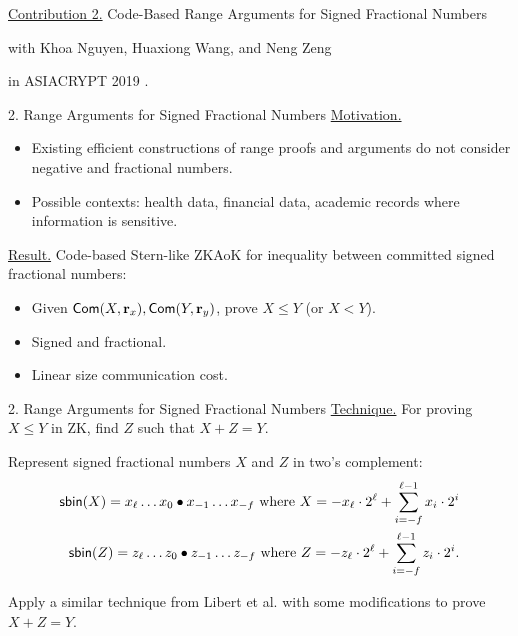 \begin{frame}
	\underline{Contribution 2.} Code-Based Range Arguments for Signed Fractional Numbers
	
	{\small with Khoa Nguyen, Huaxiong Wang, and Neng Zeng}
	
	in ASIACRYPT 2019 \cite{NguyenTWZ19}.
\end{frame}

\begin{frame}{2. Range Arguments for Signed Fractional Numbers}
	\underline{Motivation.} \pause
	\begin{itemize}
		\item Existing efficient constructions of range proofs and arguments do not consider negative and fractional numbers.\pause
		\item Possible contexts: health data, financial data, academic records where information is sensitive.\pause
	\end{itemize}

	\underline{Result.} Code-based Stern-like ZKAoK for inequality between committed signed fractional numbers:\pause
	\begin{itemize}
		\item Given $\mathsf{Com }(X, \mathbf{r}_x), \mathsf{Com }(Y, \mathbf{r}_y)$, prove $X \leq Y$ (or $X < Y$).\pause 
		\item Signed and fractional.\pause
		\item Linear size communication cost.
	\end{itemize}
	
\end{frame}

\begin{frame}{2. Range Arguments for Signed Fractional Numbers}
	\underline{Technique.} For proving $X \leq Y$ in ZK, find $Z$ such that $X + Z = Y$.\pause
	
	Represent signed fractional numbers $X$ and $Z$ in two's complement:\pause
	\begin{align*}
		\mathsf{sbin}(X) = x_\ell \dots x_0\bullet x_{-1}\dots x_{-f} \text{ where } X = -x_\ell \cdot 2^{\ell} + \sum_{i = -f}^{\ell-1} x_i\cdot 2^i\\ 
		\mathsf{sbin}(Z) = z_\ell \dots z_0\bullet z_{-1}\dots z_{-f} \text{ where } Z = -z_\ell \cdot 2^{\ell} + \sum_{i = -f}^{\ell-1} z_i\cdot 2^i.
	\end{align*}\pause

	Apply a similar technique from Libert et al. \cite{LibertLNW18} with some modifications to prove $X + Z = Y$.
\end{frame}